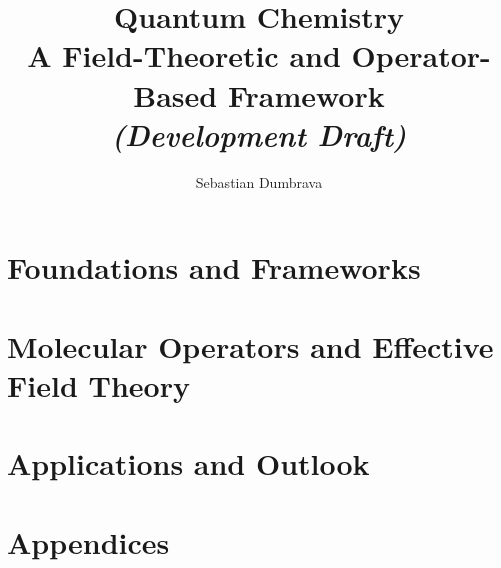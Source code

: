 \documentclass{amsbook}
\title{\Huge\textbf{Quantum Chemistry} \\[0.5cm]
	\Large A Field-Theoretic and Operator-Based Framework \\[1cm]
	\normalsize\textit{(Development Draft)}}
\author{Sebastian Dumbrava}
\date{}
\theoremstyle{plain}
\theoremstyle{definition}
\theoremstyle{remark}
\begin{document}
	
	\maketitle
	
	\frontmatter
	
	\tableofcontents
	
	\mainmatter
	
	\part{Foundations and Frameworks}
	
	
	
	
	
	\part{Molecular Operators and Effective Field Theory}
	
	
	
	
	
	\part{Applications and Outlook}
	
	
	
	
	
	\appendix
	\part*{Appendices}
	
	
	
	
	
	\backmatter
	
	\cleardoublepage
	\printbibliography
	
	
\end{document}
